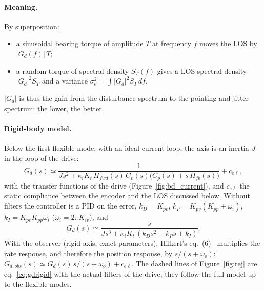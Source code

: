 \documentclass[10pt,a4paper]{article}
\numberwithin{equation}{section}
\begin{document}
\paragraph{Meaning.} By superposition:
\begin{itemize}
\item a sinusoidal bearing torque of amplitude $T$ at frequency $f$ moves the LOS by $|G_d(f)|\,T$;
\item a random torque of spectral density $S_T(f)$ gives a LOS spectral density $|G_d|^2S_T$ and a variance $\sigma_\theta^2=\int|G_d|^2S_T\,df$.
\end{itemize}
$|G_d|$ is thus the gain from the disturbance spectrum to the pointing and jitter spectrum: the lower, the better.

\paragraph{Rigid-body model.} Below the first flexible mode, with an ideal current loop, the axis is an inertia $J$ in the loop of the drive:
\begin{equation}
G_d(s)\simeq\frac{1}{Js^2+\kappa_iK_t\,H_{fwd}(s)\,C_v(s)\bigl(C_p(s)+s\,H_{fb}(s)\bigr)}+c_{e\ell},\label{eq:gdrigid}
\end{equation}
with the transfer functions of the drive (Figure~\ref{fig:bd_current}), and $c_{e\ell}$ the static compliance between the encoder and the LOS discussed below. Without filters the controller is a PID on the error, $k_D=K_{pv}$, $k_P=K_{pv}(K_{pp}+\omega_i)$, $k_I=K_{pv}K_{pp}\omega_i$ ($\omega_i=2\pi K_{iv}$), and
\begin{equation}
G_d(s)\simeq\frac{s}{Js^3+\kappa_iK_t\,(k_Ds^2+k_Ps+k_I)} .
\end{equation}
With the observer (rigid axis, exact parameters), Hilkert's eq.~(6)~\cite{hilkert2011} multiplies the rate response, and therefore the position response, by $s/(s+\omega_o)$: $G_{d,obs}(s)\simeq G_d(s)\,s/(s+\omega_o)+c_{e\ell}$. The dashed lines of Figure~\ref{fig:rej} are eq.~\eqref{eq:gdrigid} with the actual filters of the drive; they follow the full model up to the flexible modes.
\end{document}
